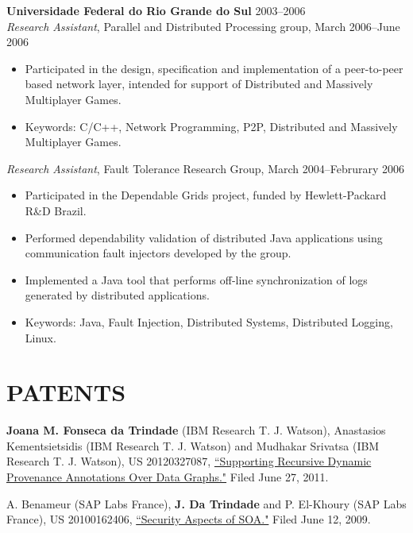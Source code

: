 \documentclass[line,margin]{res}
\begin{document}
\begin{resume}
                \textbf{Universidade Federal do Rio Grande do Sul} \hfill 2003--2006 \\
                {\sl Research Assistant}, Parallel and Distributed Processing group, March 2006--June 2006
                \begin{itemize}  \itemsep -2pt
                \item Participated in the design, specification and implementation of a peer-to-peer based 
                network layer, intended for support of Distributed and Massively Multiplayer Games.
                \item Keywords: C/C++, Network Programming, P2P, Distributed and Massively Multiplayer 
                Games.
                \end{itemize}
                {\sl Research Assistant}, Fault Tolerance Research Group, March 2004--Februrary 2006
                \begin{itemize}  \itemsep -2pt
                \item Participated in the Dependable Grids project, funded by Hewlett-Packard R\&D Brazil.
                \item Performed dependability validation of distributed Java applications using communication 
                fault injectors developed by the group. 
                \item Implemented a Java tool that performs off-line synchronization of logs generated by 
                distributed applications.
                \item Keywords: Java, Fault Injection, Distributed Systems, Distributed Logging, Linux.                
                \end{itemize}


\section{PATENTS}  \textbf{Joana M. Fonseca da Trindade} (IBM Research T. J. Watson), Anastasios Kementsietsidis (IBM Research T. J. Watson) and Mudhakar Srivatsa (IBM Research T. J. Watson), US 20120327087, \href{http://www.faqs.org/patents/app/20120327087}{``Supporting Recursive Dynamic Provenance Annotations Over Data Graphs."} Filed June 27, 2011.

A. Benameur (SAP Labs France), \textbf{J. Da Trindade} and P. El-Khoury (SAP Labs France), US 20100162406, \href{http://www.faqs.org/patents/app/20100162406}{``Security Aspects of SOA."}  Filed June 12, 2009.


\end{resume}
\end{document}
